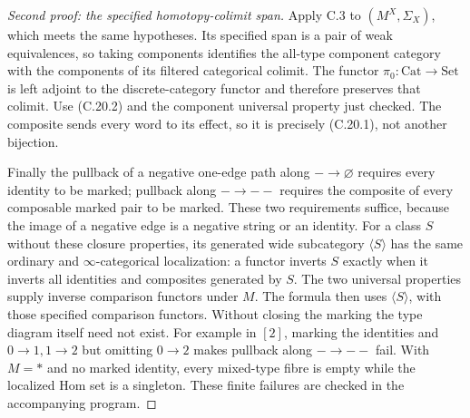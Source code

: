 \begin{proof}[Second proof: the specified homotopy-colimit span]
Apply C.3 to $(M^X,\Sigma_X)$, which meets the same hypotheses.
Its specified span is a pair of weak equivalences, so taking
components identifies the all-type component category with the
components of its filtered categorical colimit. The functor
$\pi_0:\mathrm{Cat}\to\mathrm{Set}$ is left adjoint to the
discrete-category functor and therefore preserves that colimit.
Use (C.20.2) and the component universal property just checked.
The composite sends every word to its effect, so it is precisely
(C.20.1), not another bijection.

Finally the pullback of a negative one-edge path along
$-\to\varnothing$ requires every identity to be marked; pullback
along $-\to--$ requires the composite of every composable marked
pair to be marked. These two requirements suffice, because the
image of a negative edge is a negative string or an identity.
For a class $S$ without these closure properties, its generated
wide subcategory $\langle S\rangle$ has the same ordinary and
$\infty$-categorical localization: a functor inverts $S$ exactly
when it inverts all identities and composites generated by $S$.
The two universal properties supply inverse comparison functors
under $M$. The formula then uses $\langle S\rangle$, with those
specified comparison functors. Without closing the marking the
type diagram itself need not exist. For example in $[2]$, marking
the identities and $0\to1,1\to2$ but omitting $0\to2$ makes
pullback along $-\to--$ fail. With $M=*$ and no marked identity,
every mixed-type fibre is empty while the localized Hom set is a
singleton. These finite failures are checked in the accompanying
program.
\end{proof}

